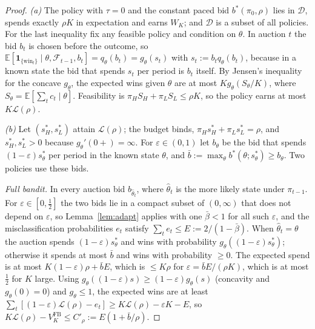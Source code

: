 \documentclass[11pt]{article}
\theoremstyle{definition}
\theoremstyle{remark}
\newcommand{\E}{\mathbb{E}}
\newcommand{\ind}[1]{\mathbf{1}_{#1}}
\begin{document}
\begin{proof}
\emph{(a)} The policy with $\tau=0$ and the constant paced bid $b^*(\pi_0,\rho)$ lies in $\mathcal D$, spends exactly
$\rho K$ in expectation and earns $W_K$; and $\mathcal D$ is a subset of all policies. For the last inequality fix any
feasible policy and condition on $\theta$. In auction $t$ the bid $b_t$ is chosen before the outcome, so
$\E[\ind{\{\text{win}_t\}}\mid\theta,\mathcal F_{t-1},b_t]=q_\theta(b_t)=g_\theta(s_t)$ with $s_t:=b_tq_\theta(b_t)$, because in a
known state the bid that spends $s_t$ per period is $b_t$ itself. By Jensen's inequality for the concave $g_\theta$,
the expected wins given $\theta$ are at most $K g_\theta(S_\theta/K)$, where $S_\theta=\E[\sum_tc_t\mid\theta]$. Feasibility
is $\pi_HS_H+\pi_LS_L\le\rho K$, so the policy earns at most $K\mathcal L(\rho)$.

\emph{(b)} Let $(s_H^*,s_L^*)$ attain $\mathcal L(\rho)$; the budget binds, $\pi_Hs^*_H+\pi_Ls^*_L=\rho$, and
$s^*_H,s^*_L>0$ because $g_\theta'(0+)=\infty$. For
$\varepsilon\in(0,1)$ let $b_\theta$ be the bid that spends $(1-\varepsilon)s^*_\theta$ per period in the known state
$\theta$, and $\bar b:=\max_\theta b^*(\theta;s^*_\theta)\ge b_\theta$. Two policies use these bids.

\emph{Full bandit.} In every auction bid $b_{\hat\theta_t}$, where $\hat\theta_t$ is the more likely state under
$\pi_{t-1}$. For $\varepsilon\in[0,\tfrac12]$ the two bids lie in a compact subset of $(0,\infty)$ that does not depend
on $\varepsilon$, so Lemma~\ref{lem:adapt} applies with one $\bar\beta<1$ for all such $\varepsilon$, and the misclassification
probabilities $e_t$ satisfy $\sum_te_t\le E:=2/(1-\bar\beta)$. When $\hat\theta_t=\theta$ the
auction spends $(1-\varepsilon)s^*_\theta$ and wins with probability $g_\theta((1-\varepsilon)s^*_\theta)$; otherwise it spends
at most $\bar b$ and wins with probability $\ge0$. The expected spend is at most $K(1-\varepsilon)\rho+\bar bE$, which is
$\le K\rho$ for $\varepsilon=\bar bE/(\rho K)$, which is at most $\tfrac12$ for $K$ large. Using $g_\theta((1-\varepsilon)s)\ge(1-\varepsilon)g_\theta(s)$ (concavity and
$g_\theta(0)=0$) and $g_\theta\le1$, the expected wins are at least
$\sum_t[(1-\varepsilon)\mathcal L(\rho)-e_t]\ge K\mathcal L(\rho)-\varepsilon K-E$, so
$K\mathcal L(\rho)-V^{\mathrm{FB}}_K\le C'_\rho:=E(1+\bar b/\rho)$.


\end{proof}
\end{document}
